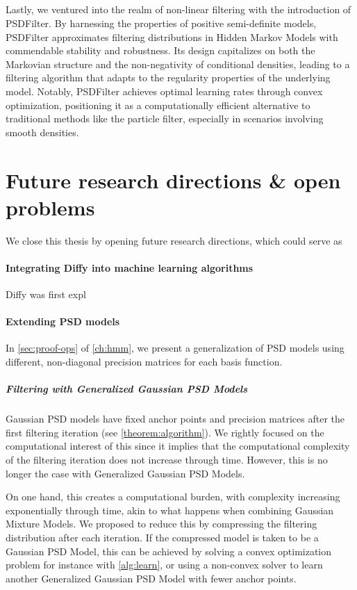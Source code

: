 \subparagraph{}Lastly, we ventured into the realm of non-linear filtering with the introduction of PSDFilter. By harnessing the properties of positive semi-definite models, PSDFilter approximates filtering distributions in Hidden Markov Models with commendable stability and robustness. Its design capitalizes on both the Markovian structure and the non-negativity of conditional densities, leading to a filtering algorithm that adapts to the regularity properties of the underlying model. Notably, PSDFilter achieves optimal learning rates through convex optimization, positioning it as a computationally efficient alternative to traditional methods like the particle filter, especially in scenarios involving smooth densities.

\section*{Future research directions \& open problems}

We close this thesis by opening future research directions, which could serve as

\paragraph{Integrating Diffy into machine learning algorithms} Diffy was first expl


\paragraph{Extending PSD models}
In \cref{sec:proof-ops} of \cref{ch:hmm}, we present a generalization of PSD models using different, non-diagonal precision matrices for each basis function.

\subparagraph{Filtering with Generalized Gaussian PSD Models} Gaussian PSD models have fixed anchor points and precision matrices after the first filtering iteration (see \cref{theorem:algorithm}). We rightly focused on the computational interest of this since it implies that the computational complexity of the filtering iteration does not increase through time. However, this is no longer the case with Generalized Gaussian PSD Models.

On one hand, this creates a computational burden, with complexity increasing exponentially through time, akin to what happens when combining Gaussian Mixture Models. We proposed to reduce this by compressing the filtering distribution after each iteration. If the compressed model is taken to be a Gaussian PSD Model, this can be achieved by solving a convex optimization problem for instance with \cref{alg:learn}, or using a non-convex solver to learn another Generalized Gaussian PSD Model with fewer anchor points.

